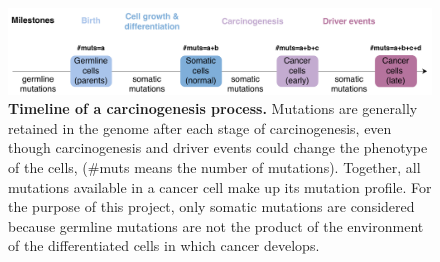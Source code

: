 \begin{figure}[h!]
    \centering
    \includegraphics[scale=0.78]{graphics/drivers_demo.pdf}
    \caption{\textbf{Timeline of a carcinogenesis process.} Mutations are generally retained in the genome after each stage of carcinogenesis, even though carcinogenesis and driver events could change the phenotype of the cells, (\#muts means the number of mutations). Together, all mutations available in a cancer cell make up its mutation profile. For the purpose of this project, only somatic mutations are considered because germline mutations are not the product of the environment of the differentiated cells in which cancer develops.}
    \label{fig:drivers_demo}
\end{figure}
